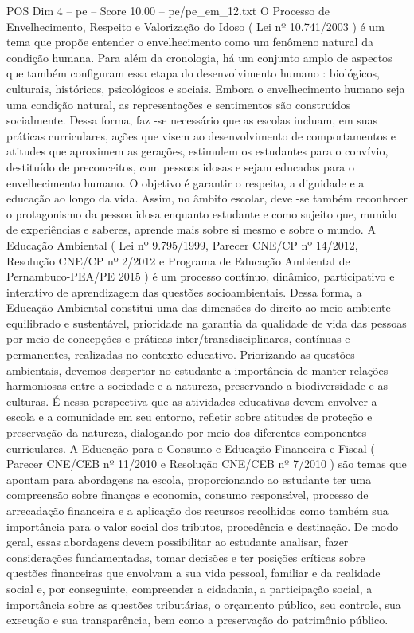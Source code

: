 \begin{textsample}{POS Dim 4 – pe – Score 10.00 – pe/pe\_em\_12.txt}
O Processo de Envelhecimento, Respeito e Valorização do Idoso ( Lei nº 10.741/2003 ) é um tema que propõe entender o envelhecimento como um fenômeno natural da condição humana.
Para além da cronologia, há um conjunto amplo de aspectos que também configuram essa etapa do desenvolvimento humano : biológicos, culturais, históricos, psicológicos e sociais.
Embora o envelhecimento humano seja uma condição natural, as representações e sentimentos são construídos socialmente.
Dessa forma, faz -se necessário que as escolas incluam, em suas práticas curriculares, ações que visem ao desenvolvimento de comportamentos e atitudes que aproximem as gerações, estimulem os estudantes para o convívio, destituído de preconceitos, com pessoas idosas e sejam educadas para o envelhecimento humano.
O objetivo é garantir o respeito, a dignidade e a educação ao longo da vida.
Assim, no âmbito escolar, deve -se também reconhecer o protagonismo da pessoa idosa enquanto estudante e como sujeito que, munido de experiências e saberes, aprende mais sobre si mesmo e sobre o mundo.
A Educação Ambiental ( Lei nº 9.795/1999, Parecer CNE/CP nº 14/2012, Resolução CNE/CP nº 2/2012 e Programa de Educação Ambiental de Pernambuco-PEA/PE 2015 ) é um processo contínuo, dinâmico, participativo e interativo de aprendizagem das questões socioambientais.
Dessa forma, a Educação Ambiental constitui uma das dimensões do direito ao meio ambiente equilibrado e sustentável, prioridade na garantia da qualidade de vida das pessoas por meio de concepções e práticas inter/transdisciplinares, contínuas e permanentes, realizadas no contexto educativo.
Priorizando as questões ambientais, devemos despertar no estudante a importância de manter relações harmoniosas entre a sociedade e a natureza, preservando a biodiversidade e as culturas.
É nessa perspectiva que as atividades educativas devem envolver a escola e a comunidade em seu entorno, refletir sobre atitudes de proteção e preservação da natureza, dialogando por meio dos diferentes componentes curriculares.
A Educação para o Consumo e Educação Financeira e Fiscal ( Parecer CNE/CEB nº 11/2010 e Resolução CNE/CEB nº 7/2010 ) são temas que apontam para abordagens na escola, proporcionando ao estudante ter uma compreensão sobre finanças e economia, consumo responsável, processo de arrecadação financeira e a aplicação dos recursos recolhidos como também sua importância para o valor social dos tributos, procedência e destinação.
De modo geral, essas abordagens devem possibilitar ao estudante analisar, fazer considerações fundamentadas, tomar decisões e ter posições críticas sobre questões financeiras que envolvam a sua vida pessoal, familiar e da realidade social e, por conseguinte, compreender a cidadania, a participação social, a importância sobre as questões tributárias, o orçamento público, seu controle, sua execução e sua transparência, bem como a preservação do patrimônio público.

\end{textsample}
